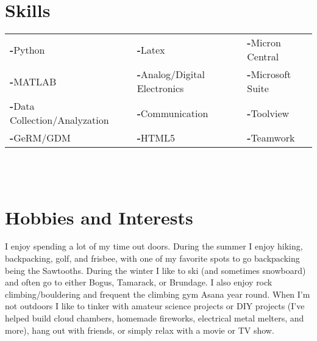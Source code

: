 \documentclass[a4paper,12pt]{article}
\begin{document}
\section{Skills}
    \begin{tabular}{|p{}|p{}|p{}}
         \textbf{-}Python & \textbf{-}Latex & \textbf{-}Micron Central \\
         \textbf{-}MATLAB & \textbf{-}Analog/Digital Electronics & \textbf{-}Microsoft Suite \\
         \textbf{-}Data Collection/Analyzation & \textbf{-}Communication & \textbf{-}Toolview \\
         \textbf{-}GeRM/GDM & \textbf{-}HTML5 & \textbf{-}Teamwork \\
    \end{tabular}
\\
\\
\section{Hobbies and Interests}
I enjoy spending a lot of my time out doors. During the summer I enjoy hiking, backpacking, golf, and frisbee, with one of my favorite spots to go backpacking being the Sawtooths. During the winter I like to ski (and sometimes snowboard) and often go to either Bogus, Tamarack, or Brundage. I also enjoy rock climbing/bouldering and frequent the climbing gym Asana year round. When I'm not outdoors I like to tinker with amateur science projects or DIY projects (I've helped build cloud chambers, homemade fireworks, electrical metal melters, and more), hang out with friends, or simply relax with a movie or TV show. 
\end{document}
